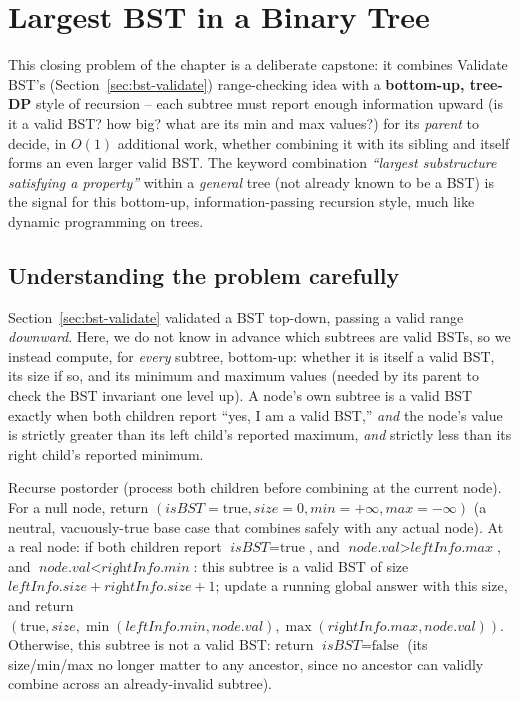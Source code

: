 \section{Largest BST in a Binary Tree}
\label{sec:bst-largest-bst}


\begin{patternbox}
This closing problem of the chapter is a deliberate capstone: it combines
Validate BST's (Section~\ref{sec:bst-validate}) range-checking idea with
a \textbf{bottom-up, tree-DP} style of recursion -- each subtree must
report enough information upward (is it a valid BST? how big? what are
its min and max values?) for its \emph{parent} to decide, in $O(1)$
additional work, whether combining it with its sibling and itself forms
an even larger valid BST. The keyword combination \emph{``largest
substructure satisfying a property''} within a \emph{general} tree (not
already known to be a BST) is the signal for this bottom-up,
information-passing recursion style, much like dynamic programming on
trees.
\end{patternbox}

\subsection*{Understanding the problem carefully}

Section~\ref{sec:bst-validate} validated a BST top-down, passing a valid
range \emph{downward}. Here, we do not know in advance which subtrees are
valid BSTs, so we instead compute, for \emph{every} subtree, bottom-up:
whether it is itself a valid BST, its size if so, and its minimum and
maximum values (needed by its parent to check the BST invariant one
level up). A node's own subtree is a valid BST exactly when both children
report ``yes, I am a valid BST,'' \emph{and} the node's value is strictly
greater than its left child's reported maximum, \emph{and} strictly less
than its right child's reported minimum.

\begin{ideabox}
Recurse postorder (process both children before combining at the current
node). For a null node, return $(\textit{isBST}=\text{true},
\textit{size}=0, \textit{min}=+\infty, \textit{max}=-\infty)$ (a
neutral, vacuously-true base case that combines safely with any actual
node). At a real node: if both children report $\textit{isBST}=\text{true}$,
and $\textit{node.val} > \textit{leftInfo.max}$, and
$\textit{node.val} < \textit{rightInfo.min}$: this subtree is a valid
BST of size $\textit{leftInfo.size} + \textit{rightInfo.size} + 1$; update
a running global answer with this size, and return
$(\text{true}, \textit{size}, \min(\textit{leftInfo.min},
\textit{node.val}), \max(\textit{rightInfo.max}, \textit{node.val}))$.
Otherwise, this subtree is not a valid BST: return
$\textit{isBST}=\text{false}$ (its size/min/max no longer matter to any
ancestor, since no ancestor can validly combine across an already-invalid
subtree).
\end{ideabox}

